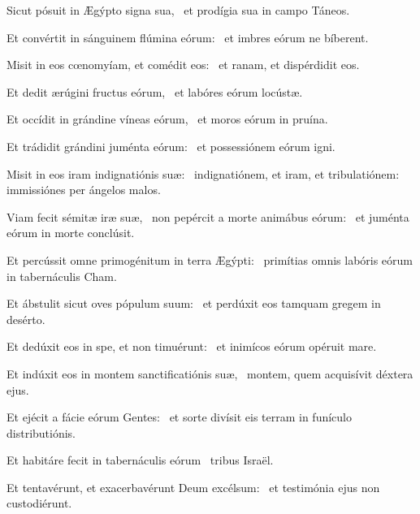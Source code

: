\item Sicut pósuit in Ægýpto signa sua,~\psstar{} et prodígia sua in campo Táneos.

\item Et convértit in sánguinem flúmina eórum:~\psstar{} et imbres eórum ne bíberent.

\item Misit in eos cœnomyíam, et comédit eos:~\psstar{} et ranam, et dispérdidit eos.

\item Et dedit ærúgini fructus eórum,~\psstar{} et labóres eórum locústæ.

\item Et occídit in grándine víneas eórum,~\psstar{} et moros eórum in pruína.

\item Et trádidit grándini juménta eórum:~\psstar{} et possessiónem eórum igni.

\item Misit in eos iram indignatiónis suæ:~\psstar{} indignatiónem, et iram, et tribulatiónem: immissiónes per ángelos malos.

\item Viam fecit sémitæ iræ suæ,~\pscross{} non pepércit a morte animábus eórum:~\psstar{} et juménta eórum in morte conclúsit.

\item Et percússit omne primogénitum in terra Ægýpti:~\psstar{} primítias omnis labóris eórum in tabernáculis Cham.

\item Et ábstulit sicut oves pópulum suum:~\psstar{} et perdúxit eos tamquam gregem in desérto.

\item Et dedúxit eos in spe, et non timuérunt:~\psstar{} et inimícos eórum opéruit mare.

\item Et indúxit eos in montem sanctificatiónis suæ,~\psstar{} montem, quem acquisívit déxtera ejus.

\item Et ejécit a fácie eórum Gentes:~\psstar{} et sorte divísit eis terram in funículo distributiónis.

\item Et habitáre fecit in tabernáculis eórum~\psstar{} tribus Israël.

\item Et tentavérunt, et exacerbavérunt Deum excélsum:~\psstar{} et testimónia ejus non custodiérunt.

